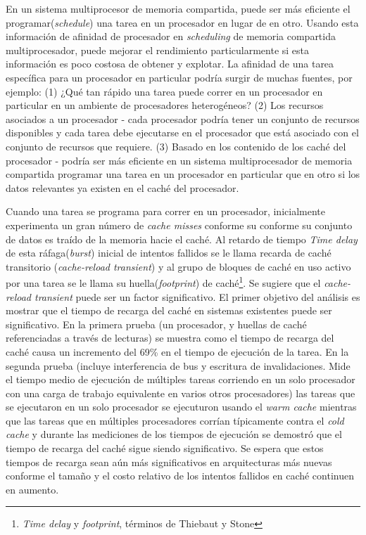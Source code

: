 En un sistema multiprocesor de memoria compartida, puede ser más eficiente el programar(\textit{schedule}) una tarea en un procesador en lugar de en otro. Usando esta información de afinidad de procesador en \textit{scheduling} de memoria compartida multiprocesador, puede mejorar el rendimiento particularmente si esta información es poco costosa de obtener y explotar. La afinidad de una tarea específica para un procesador en particular podría surgir de muchas fuentes, por ejemplo: (1) ¿Qué tan rápido una tarea puede correr en un procesador en particular en un ambiente de procesadores heterogéneos? (2) Los recursos asociados a un procesador - cada procesador podría tener un conjunto de recursos disponibles y cada tarea debe ejecutarse en el procesador que está asociado con el conjunto de recursos que requiere. (3) Basado en los contenido de los caché del procesador - podría ser más eficiente en un sistema multiprocesador de memoria compartida programar una tarea en un procesador en particular que en otro si los datos relevantes ya existen en el caché del procesador.

Cuando una tarea se programa para correr en un procesador, inicialmente experimenta un gran número de \textit{cache misses} conforme su conforme su conjunto de datos es traído de la memoria hacie el caché. Al retardo de tiempo \textit{Time delay} de esta ráfaga(\textit{burst}) inicial de intentos fallidos se le llama recarda de caché transitorio (\textit{cache-reload transient}) y al grupo de bloques de caché en uso activo por una tarea se le llama su huella(\textit{footprint}) de caché\footnote{\textit{Time delay} y \textit{footprint}, términos de Thiebaut y Stone}. Se sugiere que el \textit{cache-reload transient} puede ser un factor significativo. El primer objetivo del análisis es mostrar que el tiempo de recarga del caché en sistemas existentes puede ser significativo. En la primera prueba (un procesador, y huellas de caché referenciadas a través de lecturas) se muestra como el tiempo de recarga del caché causa un incremento del 69\% en el tiempo de ejecución de la tarea. En la segunda prueba (incluye interferencia de bus y escritura de invalidaciones. Mide el tiempo medio de ejecución de múltiples tareas corriendo en un solo procesador con una carga de trabajo equivalente en varios otros procesadores) las tareas que se ejecutaron en un solo procesador se ejecuturon usando el \textit{warm cache} mientras que las tareas que en múltiples procesadores corrían típicamente contra el \textit{cold cache} y durante las mediciones de los tiempos de ejecución se demostró que el tiempo de recarga del caché sigue siendo significativo. Se espera que estos tiempos de recarga sean aún más significativos en arquitecturas más nuevas conforme el tamaño y el costo relativo de los intentos fallidos en caché continuen en aumento.


